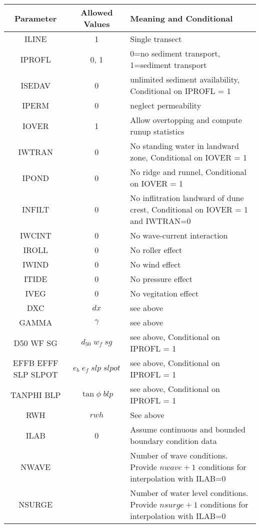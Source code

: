 \documentclass[11pt,oneside]{book}
\begin{document}
\begin{table}[h]
\begin{center}
\begin{tabular}{||c|c|p{8cm}||}\hline
Parameter& Allowed Values   & Meaning and Conditional  \\ \hline \hline
ILINE & 1 & Single transect  \\ \hline
IPROFL & 0, 1 &  0=no sediment transport, 1=sediment transport\\ \hline
ISEDAV & 0 & unlimited sediment availability, Conditional on IPROFL = 1 \\ \hline
IPERM & 0 & neglect permeability \\ \hline
IOVER & 1 & Allow overtopping and compute runup statistics \\ \hline
IWTRAN & 0 & No standing water in landward zone, Conditional on IOVER = 1 \\ \hline
IPOND & 0 & No ridge and runnel, Conditional on IOVER = 1 \\ \hline
INFILT & 0 & No inflitration landward of dune crest, Conditional on IOVER = 1 and IWTRAN=0 \\ \hline
IWCINT & 0 & No wave-current interaction\\ \hline
IROLL & 0 & No roller effect\\ \hline
IWIND & 0 & No wind effect\\ \hline
ITIDE & 0 & No pressure effect\\ \hline
IVEG & 0 & No vegitation effect\\ \hline
DXC & $dx$ & see above\\ \hline
GAMMA & $\gamma$ & see above\\ \hline
D50 \; WF \; SG & $d_{50} \; w_f \; sg$ & see above, Conditional on IPROFL = 1\\ \hline
EFFB \; EFFF \; SLP \; SLPOT & $ e_{b} \; e_{f} \; slp \; slpot$ & see above, Conditional on IPROFL = 1\\ \hline
TANPHI  BLP & $ \tan \phi  \; blp $ & see above, Conditional on IPROFL = 1\\ \hline
RWH & $rwh$ & See above\\ \hline
ILAB & 0 & Assume continuous and bounded boundary condition data\\ \hline
NWAVE &  & Number of wave conditions. Provide $nwave+1$ conditions for interpolation with ILAB=0\\ \hline
NSURGE &  & Number of water level conditions. Provide $nsurge+1$ conditions for interpolation with ILAB=0\\ \hline

\end{tabular}
\end{center}
\end{table}
\end{document}
